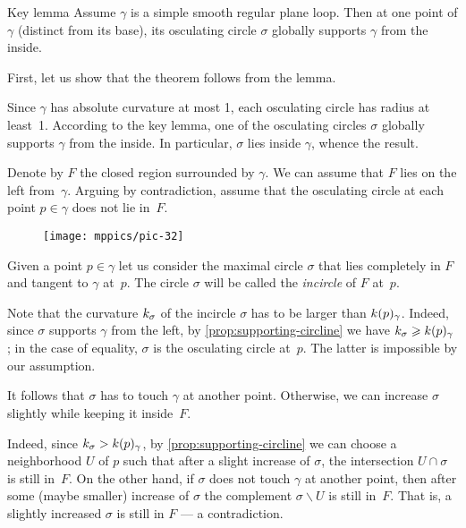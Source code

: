 \begin{thm}{Key lemma}\label{thm:moon}
Assume $\gamma$ is a simple smooth regular plane loop.
Then at one point of $\gamma$ (distinct from its base), its osculating circle $\sigma$ globally supports $\gamma$ from the inside.
\end{thm}

First, let us show that the theorem follows from the lemma.

Since $\gamma$ has absolute curvature at most 1, each osculating circle has radius at least~1.
According to the key lemma, one of the osculating circles $\sigma$ globally supports $\gamma$ from the inside.
In particular, $\sigma$ lies inside $\gamma$, whence the result.
\qeds

Denote by $F$ the closed region surrounded by $\gamma$.
We can assume that $F$ lies on the left from~$\gamma$.
Arguing by contradiction,
assume that the osculating circle at each point $p\in \gamma$ does not lie in~$F$.

\begin{figure}[!ht]
\vskip-0mm
\centering
\texttt{[image: mppics/pic-32]}
\vskip0mm
\end{figure}

Given a point $p\in\gamma$ let us consider the maximal circle $\sigma$ that lies completely in $F$ and tangent to $\gamma$ at~$p$.
The circle $\sigma$ will be called the {}\emph{incircle} of $F$ at~$p$.

Note that the curvature $k_\sigma$ of the incircle $\sigma$ has to be larger than $k(p)_\gamma$.
Indeed, since $\sigma$ supports $\gamma$ from the left, by \ref{prop:supporting-circline} we have $k_\sigma\geqslant k(p)_\gamma$; in the case of equality, $\sigma$ is the osculating circle at~$p$.
The latter is impossible by our assumption.

It follows that $\sigma$ has to touch $\gamma$ at another point.
Otherwise, we can increase $\sigma$ slightly while keeping it inside~$F$.

Indeed, since $k_\sigma> k(p)_\gamma$, 
by \ref{prop:supporting-circline} we can choose a neighborhood $U$ of $p$ such that after a slight increase of $\sigma$, the intersection $U\cap \sigma$ is still in~$F$.
On the other hand, if $\sigma$ does not touch $\gamma$ at another point, then after some (maybe smaller) increase of $\sigma$ the complement $\sigma\backslash U$ is still in~$F$.
That is, a slightly increased $\sigma$ is still in $F$ --- a contradiction.




